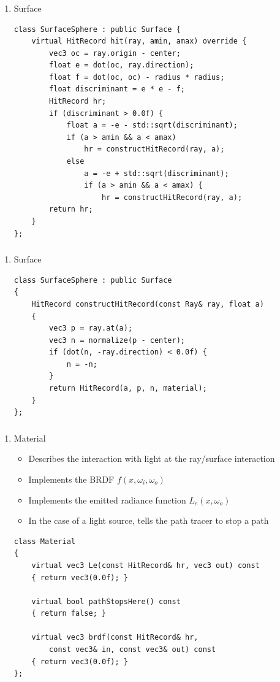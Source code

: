 \documentclass[utf8,stillsansserifmath,fleqn,t]{beamer}
\newcommand{\labelname}[1]{\def\insertenumlabel{#1}\usebeamertemplate{enumerate item}}
\begin{document}
\begin{frame}[fragile]
\frametitle{\insertsection}
\begin{enumerate}
\item[\labelname{3}] Surface
\begin{lstlisting}
class SurfaceSphere : public Surface {
    virtual HitRecord hit(ray, amin, amax) override {
        vec3 oc = ray.origin - center;
        float e = dot(oc, ray.direction);
        float f = dot(oc, oc) - radius * radius;
        float discriminant = e * e - f;
        HitRecord hr;
        if (discriminant > 0.0f) {
            float a = -e - std::sqrt(discriminant);
            if (a > amin && a < amax)
                hr = constructHitRecord(ray, a);
            else
                a = -e + std::sqrt(discriminant);
                if (a > amin && a < amax) {
                    hr = constructHitRecord(ray, a);
        return hr;
    }
};
\end{lstlisting}
\end{enumerate}
\end{frame}

\begin{frame}[fragile]
\frametitle{\insertsection}
\begin{enumerate}
\item[\labelname{3}] Surface
\begin{lstlisting}
class SurfaceSphere : public Surface
{
    HitRecord constructHitRecord(const Ray& ray, float a)
    {
        vec3 p = ray.at(a);
        vec3 n = normalize(p - center);
        if (dot(n, -ray.direction) < 0.0f) {
            n = -n;
        }
        return HitRecord(a, p, n, material);
    }
};
\end{lstlisting}
\end{enumerate}
\end{frame}

\begin{frame}[fragile]
\frametitle{\insertsection}
\begin{enumerate}
\item[\labelname{4}] Material
\begin{itemize}
\item Describes the interaction with light at the ray/surface interaction
\item Implements the BRDF $f(x,\omega_i,\omega_o)$
\item Implements the emitted radiance function $L_e(x,\omega_o)$
\item In the case of a light source, tells the path tracer to stop a path
\end{itemize}
\begin{lstlisting}
class Material
{
    virtual vec3 Le(const HitRecord& hr, vec3 out) const
    { return vec3(0.0f); }

    virtual bool pathStopsHere() const
    { return false; }

    virtual vec3 brdf(const HitRecord& hr,
        const vec3& in, const vec3& out) const
    { return vec3(0.0f); }
};
\end{lstlisting}
\end{enumerate}
\end{frame}
\end{document}

